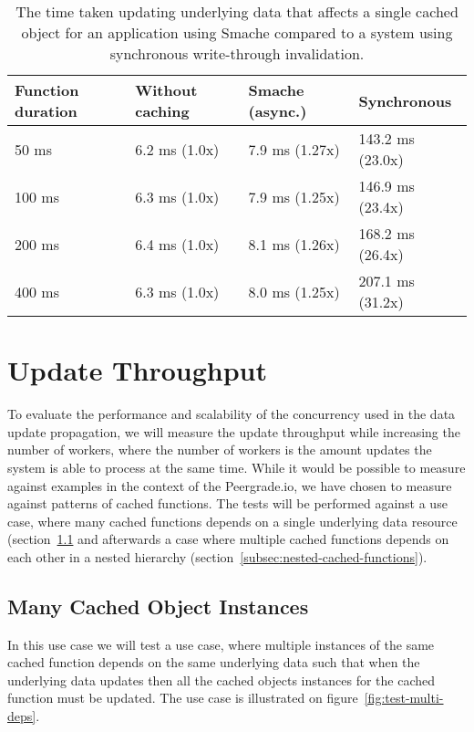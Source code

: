 \begin{table}[ht!]
  \centering
  \begin{tabular}{llll}
    \hline
    Function duration & Without caching & Smache (async.) & Synchronous \\
    \hline
    50 ms  & 6.2 ms (1.0x)  & 7.9 ms (1.27x)  &  143.2 ms (23.0x) \\
    100 ms & 6.3 ms (1.0x)  & 7.9 ms (1.25x)  &  146.9 ms (23.4x) \\
    200 ms & 6.4 ms (1.0x)  & 8.1 ms (1.26x)  &  168.2 ms (26.4x) \\
    400 ms & 6.3 ms (1.0x)  & 8.0 ms (1.25x)  &  207.1 ms (31.2x) \\
    \hline
  \end{tabular}
  \caption{The time taken updating underlying data that affects a single cached object for an application using Smache compared to a system using synchronous write-through invalidation.}
  \label{tab:update-requests}
\end{table}


\section{Update Throughput}
\label{sec:update-throughput}

To evaluate the performance and scalability of the concurrency used in the data update propagation, we will measure the update throughput while increasing the number of workers, where the number of workers is the amount updates the system is able to process at the same time. While it would be possible to measure against examples in the context of the Peergrade.io, we have chosen to measure against patterns of cached functions. The tests will be performed against a use case, where many cached functions depends on a single underlying data resource (section~\ref{subsec:many-cached-object-instances} and afterwards a case where multiple cached functions depends on each other in a nested hierarchy (section~\ref{subsec:nested-cached-functions}).

\subsection{Many Cached Object Instances}
\label{subsec:many-cached-object-instances}

In this use case we will test a use case, where multiple instances of the same cached function depends on the same underlying data such that when the underlying data updates then all the cached objects instances for the cached function must be updated. The use case is illustrated on figure~\ref{fig:test-multi-deps}.

